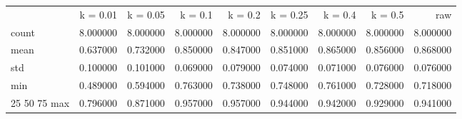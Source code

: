 \begin{tabular}{lrrrrrrrr}
{} & {k = 0.01} & {k = 0.05} & { k = 0.1} & {k = 0.2} & {k = 0.25} & {k = 0.4} & {k = 0.5} & {raw} \\
count & 8.000000 & 8.000000 & 8.000000 & 8.000000 & 8.000000 & 8.000000 & 8.000000 & 8.000000 \\
mean & 0.637000 & 0.732000 & 0.850000 & 0.847000 & 0.851000 & 0.865000 & 0.856000 & 0.868000 \\
std & 0.100000 & 0.101000 & 0.069000 & 0.079000 & 0.074000 & 0.071000 & 0.076000 & 0.076000 \\
min & 0.489000 & 0.594000 & 0.763000 & 0.738000 & 0.748000 & 0.761000 & 0.728000 & 0.718000 \\
25%
50%
75%
max & 0.796000 & 0.871000 & 0.957000 & 0.957000 & 0.944000 & 0.942000 & 0.929000 & 0.941000 \\
\end{tabular}
